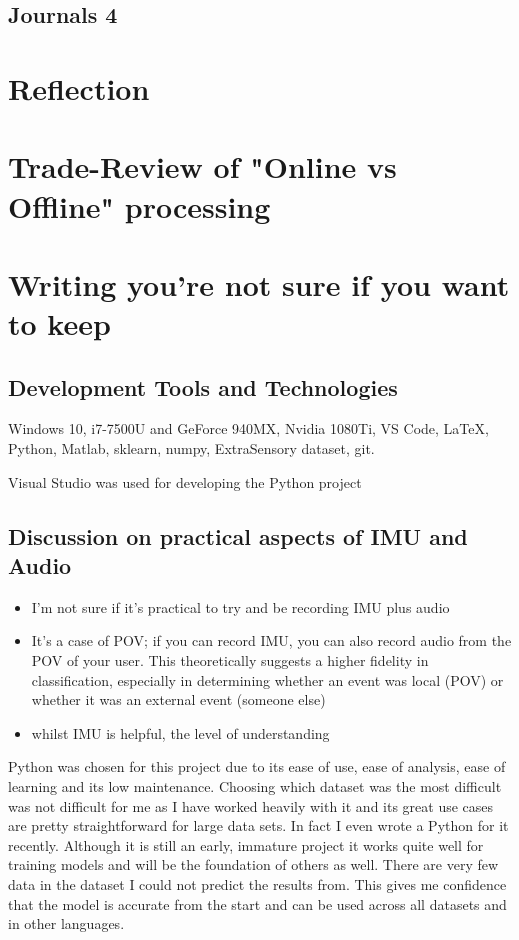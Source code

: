 \documentclass{UoNMCHA}
\numberwithin{equation}{section}
\begin{document}
\subsection{Journals 4}
\section{Reflection}
\section{Trade-Review of "Online vs Offline" processing}\label{sec:TradeReview}

\section{Writing you're not sure if you want to keep}
\subsection{Development Tools and Technologies}
Windows 10, i7-7500U and GeForce 940MX, Nvidia 1080Ti, VS Code, LaTeX, Python, Matlab, sklearn, numpy, ExtraSensory dataset, git.

Visual Studio was used for developing the Python project

\subsection{Discussion on practical aspects of IMU and Audio}

\begin{itemize}
    \item I'm not sure if it's practical to try and be recording IMU plus audio
    \item It's a case of POV; if you can record IMU, you can also record audio from the POV of your user. This theoretically suggests a higher fidelity in classification, especially in determining whether an event was local (POV) or whether it was an external event (someone else)
    \item whilst IMU is helpful, the level of understanding
\end{itemize}

Python was chosen for this project due to its ease of use, ease of analysis, ease of learning and its low maintenance. Choosing which dataset was the most difficult was not difficult for me as I have worked heavily with it and its great use cases are pretty straightforward for large data sets. In fact I even wrote a Python for it recently. Although it is still an early, immature project it works quite well for training models and will be the foundation of others as well. There are very few data in the dataset I could not predict the results from. This gives me confidence that the model is accurate from the start and can be used across all datasets and in other languages.
\end{document}
